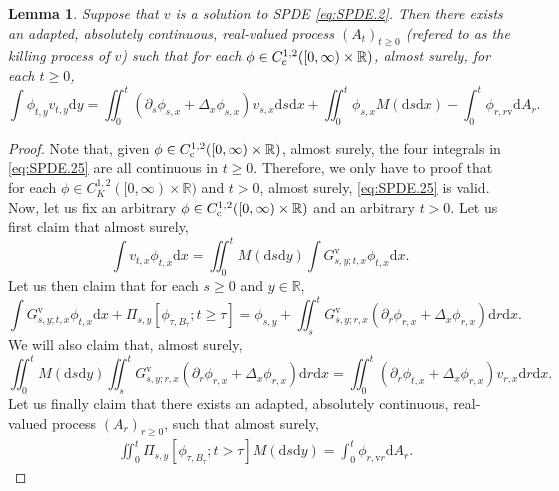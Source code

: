 \documentclass[12pt,a4paper]{amsart}
\numberwithin{equation}{section}
\theoremstyle{plain}
\newtheorem{lemma}[theorem]{Lemma}
\theoremstyle{remark}
\begin{document}
\begin{lemma} \label{thm:SC.5}
	Suppose that $v$ is a solution to SPDE \eqref{eq:SPDE.2}. 
	Then there exists an adapted, absolutely continuous, real-valued process $(A_t)_{t\geq 0}$ (refered to as the killing process of $v$) such that for each $\phi \in C_{\rm c}^{1,2}([0,\infty)\times \mathbb R)$, almost surely, for each $t\geq 0$,
\begin{equation} \label{eq:SPDE.25}
	\int \phi_{t,y} v_{t,y} \mathrm dy
	= \iint_0^t (\partial_s \phi_{s,x} +\Delta_x \phi_{s,x})v_{s,x}\mathrm ds\mathrm dx + \iint_0^t \phi_{s,x} M(\mathrm ds\mathrm dx) - \int_0^t \phi_{r,r\mathrm v}\mathrm dA_r.
\end{equation}
\end{lemma}
\begin{proof}
	Note that, given $\phi \in C_{\rm c}^{1,2}([0,\infty)\times \mathbb R)$, almost surely, the four integrals in \eqref{eq:SPDE.25} are all continuous in $t\geq 0$. 
	Therefore, we only have to proof that for each $\phi \in C_K^{1,2}([0,\infty)\times \mathbb R)$ and $t > 0$, almost surely, \eqref{eq:SPDE.25} is valid.
	Now, let us fix an arbitrary $\phi \in C_{\rm c}^{1,2}([0,\infty)\times \mathbb R)$ and an arbitrary $t > 0$.
	Let us first claim that almost surely,
\begin{equation} \label{eq:SPDE.29}
\int v_{t,x} \phi_{t,x} \mathrm dx 
=   \iint_0^t M(\mathrm ds\mathrm dy) \int G^\mathrm v_{s,y;t,x} \phi_{t,x} \mathrm dx.
\end{equation}
	Let us then claim that for each $s\geq 0$ and $y\in \mathbb R$,
\begin{equation} \label{eq:SPDE.3}
 \int G^\mathrm v_{s,y;t,x}\phi_{t,x}\mathrm dx+\Pi_{s,y}[\phi_{\tau, B_{\tau}}; t\geq \tau] 
 = \phi_{s,y}+ \iint_s^t G^\mathrm v_{s,y;r,x} (\partial_r \phi_{r,x}+\Delta_x\phi_{r,x}) \mathrm dr\mathrm dx.
\end{equation} 
	We will also claim that, almost surely,
\begin{equation} \label{eq:SPDE.31}
\iint_0^t M(\mathrm ds\mathrm dy) \iint_s^t G^\mathrm v_{s,y;r,x}(\partial_r\phi_{r,x} + \Delta_x\phi_{r,x}) \mathrm dr\mathrm dx 
= \iint_0^t  (\partial_r\phi_{t,x}+\Delta_x\phi_{r,x}) v_{r,x} \mathrm dr\mathrm dx.
\end{equation}
	Let us finally claim that there exists an adapted, absolutely continuous, real-valued process $(A_r)_{r\geq 0}$, such that almost surely,
\begin{align} \label{eq:SPDE.32}
& \iint_0^t \Pi_{s,y}[\phi_{\tau, B_\tau}; t>\tau] M(\mathrm ds\mathrm dy) = \int_0^t \phi_{r,\mathrm vr} \mathrm dA_r.

\end{align}
\end{proof}
\end{document}
